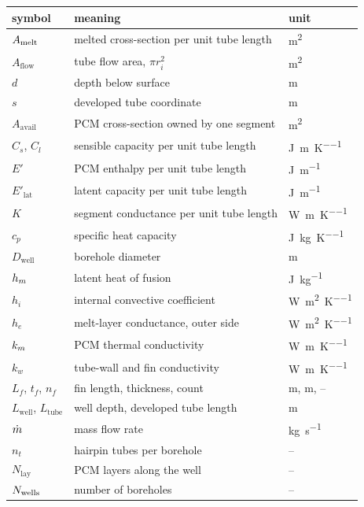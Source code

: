 \begin{longtable}{@{}l l l@{}}
\toprule
symbol & meaning & unit \\
\midrule
\endhead
$A_{\mathrm{melt}}$ & melted cross-section per unit tube length & \si{\meter\squared} \\
$A_{\mathrm{flow}}$ & tube flow area, $\pi r_{i}^{2}$ & \si{\meter\squared} \\
$d$ & depth below surface & \si{\meter} \\
$s$ & developed tube coordinate & \si{\meter} \\
$A_{\mathrm{avail}}$ & PCM cross-section owned by one segment & \si{\meter\squared} \\
$C_{s}$, $C_{l}$ & sensible capacity per unit tube length & \si{\joule\per\meter\per\kelvin} \\
$E'$ & PCM enthalpy per unit tube length & \si{\joule\per\meter} \\
$E'_{\mathrm{lat}}$ & latent capacity per unit tube length & \si{\joule\per\meter} \\
$K$ & segment conductance per unit tube length & \si{\watt\per\meter\per\kelvin} \\
$c_{p}$ & specific heat capacity & \si{\joule\per\kilogram\per\kelvin} \\
$D_{\mathrm{well}}$ & borehole diameter & \si{\meter} \\
$h_{m}$ & latent heat of fusion & \si{\joule\per\kilogram} \\
$h_{i}$ & internal convective coefficient & \si{\watt\per\meter\squared\per\kelvin} \\
$h_{e}$ & melt-layer conductance, outer side & \si{\watt\per\meter\squared\per\kelvin} \\
$k_{m}$ & PCM thermal conductivity & \si{\watt\per\meter\per\kelvin} \\
$k_{w}$ & tube-wall and fin conductivity & \si{\watt\per\meter\per\kelvin} \\
$L_{f}$, $t_{f}$, $n_{f}$ & fin length, thickness, count & \si{\meter}, \si{\meter}, -- \\
$L_{\mathrm{well}}$, $L_{\mathrm{tube}}$ & well depth, developed tube length & \si{\meter} \\
$\dot m$ & mass flow rate & \si{\kilogram\per\second} \\
$n_{t}$ & hairpin tubes per borehole & -- \\
$N_{\mathrm{lay}}$ & PCM layers along the well & -- \\
$N_{\mathrm{wells}}$ & number of boreholes & -- \\

\end{longtable}
